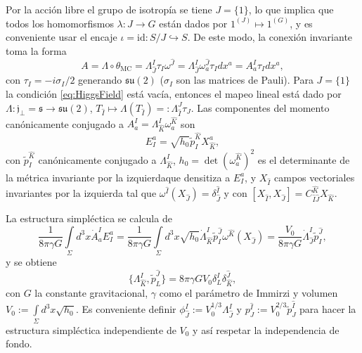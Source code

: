 Por la acci\'{o}n libre el grupo de isotrop\'{i}a se tiene $J=\{1\}$, lo que implica que todos los homomorfismos $\lambda: J \rightarrow G$ est\'{a}n dados por $1^{(J)} \longmapsto 1^{(G)}$, y es conveniente usar el encaje $\iota = \mathrm{id}: S/J \hookrightarrow S$. De este modo, la conexi\'{o}n invariante toma la forma
%
\begin{equation}
A = \Lambda \circ \theta_{\mathrm{MC}} = \Lambda^{I}_{\hat{J}} \tau_{I} \omega^{\hat{J}} =  \Lambda^{I}_{\hat{J}} \omega^{\hat{J}}_{a} \tau_{I} dx^{a}=A^{I}_{a} \tau_{I} dx^{a},
\end{equation}
%
con $\tau_{I} = -i \sigma_{I}/2$ generando $\mathfrak{su}(2)$ ($\sigma_{I}$ son las matrices de Pauli). Para $J=\{1\}$ la condici\'{o}n \eqref{eq:HiggsField} est\'{a} vac\'{i}a, entonces el mapeo lineal est\'{a} dado por $\Lambda: \mathfrak{j}_{\perp} = \mathfrak{s} \longrightarrow \mathfrak{su}(2)$, $T_{\hat{I}} \longmapsto \Lambda(T_{\hat{I}}) =: \Lambda^{J}_{\hat{I}} \tau_{J}$. Las componentes del momento can\'{o}nicamente conjugado a $A^{I}_{a} = \Lambda^{I}_{\hat{K}} \omega^{\hat{K}}_{a}$ son
%
\begin{equation}
E^{a}_{I} = \sqrt{h_{0}} \tilde{p}^{\hat{K}}_{I} X^{a}_{\hat{K}},
\end{equation}
%
con $\tilde{p}^{\hat{K}}_{I}$ can\'{o}nicamente conjugado a $\Lambda^{I}_{\hat{K}}$, $h_{0} = \det(\omega^{\hat{K}}_{a})^{2}$ es el determinante de la m\'{e}trica invariante por la izquierda\footnotemark que densitiza a $E^{a}_{I}$, y $X_{\hat{I}}$ campos vectoriales invariantes por la izquierda tal que $\omega^{\hat{I}}(X_{\hat{J}}) = \delta^{\hat{I}}_{\hat{J}}$ y con $[X_{\hat{I}}, X_{\hat{J}}] = C^{\hat{K}}_{\hat{I} \hat{J}} X_{\hat{K}}$.

La estructura simpl\'{e}ctica se calcula de
%
\begin{equation}
\frac{1}{8 \pi \gamma G} \int\limits_{\Sigma} d^{3} x \dot{A}^{I}_{a} E^{a}_{I} = \frac{1}{8 \pi \gamma G} \int\limits_{\Sigma} d^{3} x \sqrt{h_{0}} \dot{\Lambda}^{I}_{\hat{K}} \tilde{p}^{\hat{J}}_{I} \omega^{\hat{K}} (X_{\hat{J}}) = \frac{V_{0}}{8 \pi \gamma G} \dot{\Lambda}^{I}_{\hat{J}} \tilde{p}^{\hat{J}}_{I},
\end{equation}
%
y se obtiene
%
\begin{equation}
\{\Lambda^{I}_{\hat{K}}, \tilde{p}^{\hat{J}}_{L} \} = 8 \pi \gamma G V_{0} \delta^{I}_{L} \delta^{\hat{J}}_{\hat{K}},
\end{equation}
%
con $G$ la constante gravitacional, $\gamma$ como el par\'{a}metro de Immirzi y volumen $V_{0} := \int\limits_{\Sigma} d^{3} x  \sqrt{h_{0}}$. Es conveniente definir $\phi^{I}_{\hat{J}} := V_{0}^{1/3} \Lambda^{I}_{\hat{J}}$ y $p^{\hat{I}}_{J} := V_{0}^{2/3} \tilde{p}^{\hat{I}}_{J}$ para hacer la estructura simpl\'{e}ctica independiente de $V_{0}$ y as\'{i} respetar la independencia de fondo.

